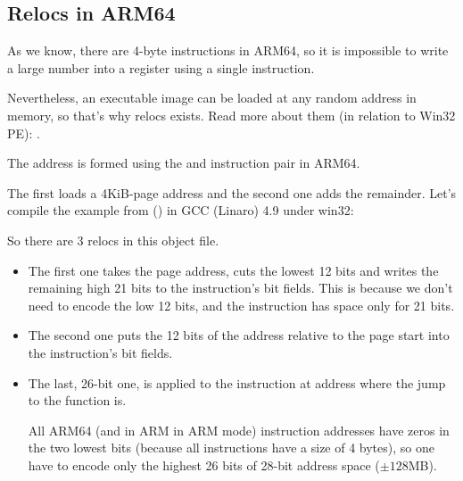 ﻿\newcommand{\ARMELF}{\InSqBrackets{\emph{ELF for the ARM 64-bit Architecture (AArch64)}, (2013)}\footnote{\AlsoAvailableAs \url{http://infocenter.arm.com/help/topic/com.arm.doc.ihi0056b/IHI0056B_aaelf64.pdf}}}

\subsection{Relocs in ARM64}
\label{ARM64_relocs}

As we know, there are 4-byte instructions in ARM64, so it is impossible to write a large number into a register
using a single instruction.

Nevertheless, an executable image can be loaded at any random address in memory, so that's why relocs exists.
Read more about them (in relation to Win32 PE): .


The address is formed using the  and \ADD instruction pair in ARM64.

The first loads a 4KiB-page address and the second one adds the remainder.
Let's compile the example from \q{\HelloWorldSectionName} 
() in GCC (Linaro) 4.9 under win32:



So there are 3 relocs in this object file.

\begin{itemize}
\item 
The first one takes the page address, cuts the lowest 12 bits and writes the remaining high 21 bits
to the  instruction's bit fields. This is because we don't need to encode the low 12 bits,
and the  instruction has space only for 21 bits.

\item 
The second one puts the 12 bits of the address relative to the page start into the \ADD instruction's bit fields.

\item 
The last, 26-bit one, is applied to the instruction at address  where the 
jump to the \printf function is.

All ARM64 (and in ARM in ARM mode) instruction addresses have zeros in the two lowest bits
(because all instructions have a size of 4 bytes),
so one have to encode only the highest 26 bits of 28-bit address space ($\pm 128$MB).

\end{itemize}

